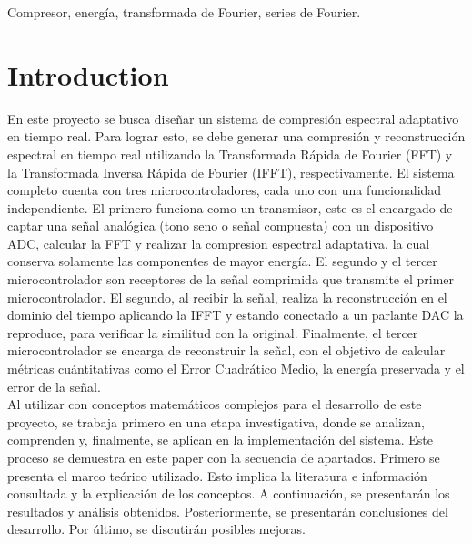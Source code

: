 \documentclass[12pt, journal]{IEEEtran}
\begin{document}
\begin{IEEEkeywords}
Compresor, energía, transformada de Fourier, series de Fourier.
\end{IEEEkeywords}

\section{Introduction}
En este proyecto se busca diseñar un sistema de compresión espectral adaptativo en tiempo real. Para lograr esto, se debe generar una compresión y reconstrucción espectral en tiempo real utilizando la Transformada Rápida de Fourier (FFT) y la Transformada Inversa Rápida de Fourier (IFFT), respectivamente. El sistema completo cuenta con tres microcontroladores, cada uno con una funcionalidad independiente. El primero funciona como un transmisor, este es el encargado de captar una señal analógica (tono seno o señal compuesta) con un dispositivo ADC, calcular la FFT y realizar la compresion espectral adaptativa, la cual conserva solamente las componentes de mayor energía. El segundo y el tercer microcontrolador son receptores de la señal comprimida que transmite el primer microcontrolador. El segundo, al recibir la señal, realiza la reconstrucción en el dominio del tiempo aplicando la IFFT y estando conectado a un parlante DAC la reproduce, para verificar la similitud con la original. Finalmente, el tercer microcontrolador se encarga de reconstruir la señal, con el objetivo de calcular métricas cuántitativas como el Error Cuadrático Medio, la energía preservada y el error de la señal.\\
Al utilizar con conceptos matemáticos complejos para el desarrollo de este proyecto, se trabaja primero en una etapa investigativa, donde se analizan, comprenden y, finalmente, se aplican en la implementación del sistema. Este proceso se demuestra en este paper con la secuencia de apartados. Primero se presenta el marco teórico utilizado. Esto implica la literatura e información consultada y la explicación de los conceptos. A continuación, se presentarán los resultados y análisis obtenidos. Posteriormente, se presentarán conclusiones del desarrollo. Por último, se discutirán posibles mejoras.
\end{document}
